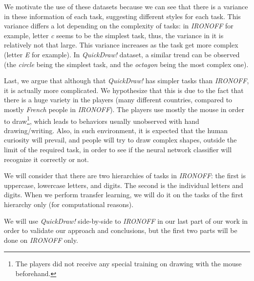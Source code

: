   \par We motivate the use of these datasets because we can see that there is a variance in these information of each task, suggesting different styles for each task. This variance differs a lot depending on the complexity of tasks: in \textit{IRONOFF} for example, letter \textit{c} seems to be the simplest task, thus, the variance in it is relatively not that large. This variance increases as the task get more complex (letter \textit{E} for example). In \textit{QuickDraw!} dataset, a similar trend can be observed (the \textit{circle} being the simplest task, and the \textit{octagon} being the most complex one).

  \par Last, we argue that although that \textit{QuickDraw!} has simpler tasks than \textit{IRONOFF}, it is actually more complicated. We hypothesize that this is due to the fact that there is a huge variety in the players (many different countries, compared to mostly \textit{French} people in \textit{IRONOFF}). The players use mostly the mouse in order to draw\footnote{The players did not receive any special training on drawing with the mouse beforehand.}, which leads to behaviors usually unobserved with hand drawing/writing. Also, in such environment, it is expected that the human curiosity will prevail, and people will try to draw complex shapes, outside the limit of the required task, in order to see if the neural network classifier will recognize it correctly or not.

  \par We will consider that there are two hierarchies of tasks in \textit{IRONOFF}: the first is uppercase, lowercase letters, and digits. The second is the individual letters and digits. When we perform transfer learning, we will do it on the tasks of the first hierarchy only (for computational reasons).

  \par We will use \textit{QuickDraw!} side-by-side to \textit{IRONOFF} in our last part of our work in order to validate our approach and conclusions, but the first two parts will be done on \textit{IRONOFF} only.

